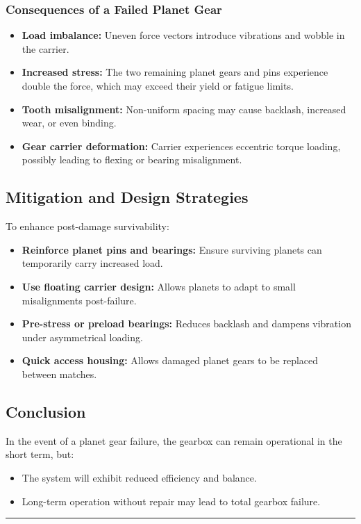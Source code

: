 \documentclass[a4paper,12pt]{article}
\begin{document}
\subsubsection*{Consequences of a Failed Planet Gear}
\begin{itemize}
    \item \textbf{Load imbalance:} Uneven force vectors introduce vibrations and wobble in the carrier.
    \item \textbf{Increased stress:} The two remaining planet gears and pins experience double the force, which may exceed their yield or fatigue limits.
    \item \textbf{Tooth misalignment:} Non-uniform spacing may cause backlash, increased wear, or even binding.
    \item \textbf{Gear carrier deformation:} Carrier experiences eccentric torque loading, possibly leading to flexing or bearing misalignment.
\end{itemize}

\subsection*{Mitigation and Design Strategies}

To enhance post-damage survivability:
\begin{itemize}
    \item \textbf{Reinforce planet pins and bearings:} Ensure surviving planets can temporarily carry increased load.
    \item \textbf{Use floating carrier design:} Allows planets to adapt to small misalignments post-failure.
    \item \textbf{Pre-stress or preload bearings:} Reduces backlash and dampens vibration under asymmetrical loading.
    \item \textbf{Quick access housing:} Allows damaged planet gears to be replaced between matches.
\end{itemize}

\subsection*{Conclusion}

In the event of a planet gear failure, the gearbox can remain operational in the short term, but:
\begin{itemize}
    \item The system will exhibit reduced efficiency and balance.
    \item Long-term operation without repair may lead to total gearbox failure.
\end{itemize}

\vspace{1em}
\noindent\rule{\linewidth}{0.6pt}
\vspace{1em}
\end{document}
